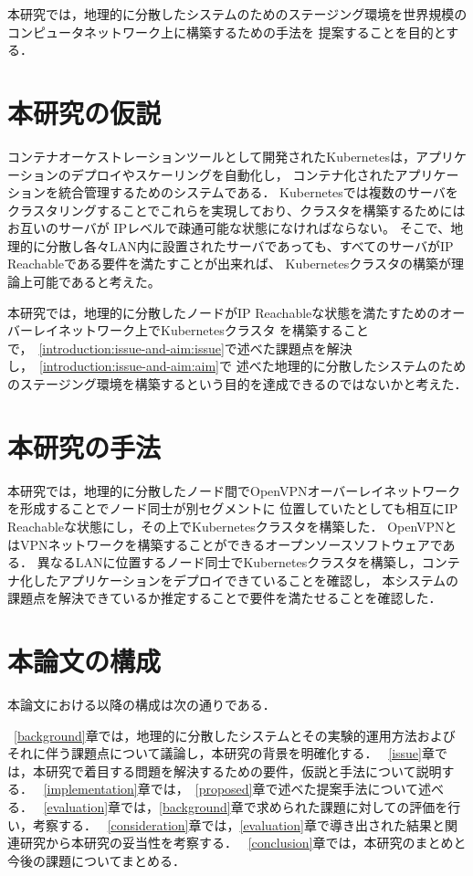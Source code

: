 本研究では，地理的に分散したシステムのためのステージング環境を世界規模のコンピュータネットワーク上に構築するための手法を
提案することを目的とする．

\section{本研究の仮説}
\label{introduction:hypothesis}

コンテナオーケストレーションツールとして開発されたKubernetesは，アプリケーションのデプロイやスケーリングを自動化し，
コンテナ化されたアプリケーションを統合管理するためのシステムである．
Kubernetesでは複数のサーバをクラスタリングすることでこれらを実現しており、クラスタを構築するためにはお互いのサーバが
IPレベルで疎通可能な状態になければならない。
そこで、地理的に分散し各々LAN内に設置されたサーバであっても、すべてのサーバがIP Reachableである要件を満たすことが出来れば、
Kubernetesクラスタの構築が理論上可能であると考えた。

本研究では，地理的に分散したノードがIP Reachableな状態を満たすためのオーバーレイネットワーク上でKubernetesクラスタ
を構築することで，~\ref{introduction:issue-and-aim:issue}で述べた課題点を解決し，~\ref{introduction:issue-and-aim:aim}で
述べた地理的に分散したシステムのためのステージング環境を構築するという目的を達成できるのではないかと考えた．

\section{本研究の手法}
\label{introduction:proposal}

本研究では，地理的に分散したノード間でOpenVPNオーバーレイネットワークを形成することでノード同士が別セグメントに
位置していたとしても相互にIP Reachableな状態にし，その上でKubernetesクラスタを構築した．
OpenVPNとはVPNネットワークを構築することができるオープンソースソフトウェアである．
異なるLANに位置するノード同士でKubernetesクラスタを構築し，コンテナ化したアプリケーションをデプロイできていることを確認し，
本システムの課題点を解決できているか推定することで要件を満たせることを確認した．

\section{本論文の構成}
\label{introduction:structure}

本論文における以降の構成は次の通りである．

~\ref{background}章では，地理的に分散したシステムとその実験的運用方法およびそれに伴う課題点について議論し，本研究の背景を明確化する．
~\ref{issue}章では，本研究で着目する問題を解決するための要件，仮説と手法について説明する．
~\ref{implementation}章では，~\ref{proposed}章で述べた提案手法について述べる．
~\ref{evaluation}章では，\ref{background}章で求められた課題に対しての評価を行い，考察する．
~\ref{consideration}章では，\ref{evaluation}章で導き出された結果と関連研究から本研究の妥当性を考察する．
~\ref{conclusion}章では，本研究のまとめと今後の課題についてまとめる．

